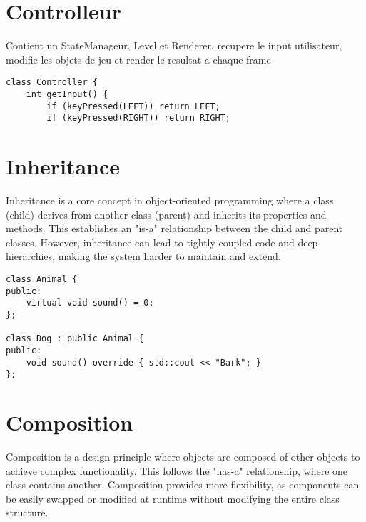 \documentclass{article}
\begin{document}
\section{Controlleur}
Contient un StateManageur, Level et Renderer, recupere le input utilisateur, modifie les objets de jeu et render le resultat a chaque frame

\begin{center}
    \begin{minipage}[c]{0.5\textwidth}
        \begin{verbatim}
class Controller {
    int getInput() {
        if (keyPressed(LEFT)) return LEFT;
        if (keyPressed(RIGHT)) return RIGHT;
        \end{verbatim}
    \end{minipage}
\end{center}

\section{Inheritance}
Inheritance is a core concept in object-oriented programming where a class (child) derives from another class (parent) and inherits its properties and methods. This establishes an "is-a" relationship between the child and parent classes. However, inheritance can lead to tightly coupled code and deep hierarchies, making the system harder to maintain and extend.

\begin{center}
    \begin{minipage}[c]{0.5\textwidth}
        \begin{verbatim}
class Animal {
public:
    virtual void sound() = 0;
};

class Dog : public Animal {
public:
    void sound() override { std::cout << "Bark"; }
};
        \end{verbatim}
    \end{minipage}
\end{center}

\section{Composition}
Composition is a design principle where objects are composed of other objects to achieve complex functionality. This follows the "has-a" relationship, where one class contains another. Composition provides more flexibility, as components can be easily swapped or modified at runtime without modifying the entire class structure.
\end{document}
